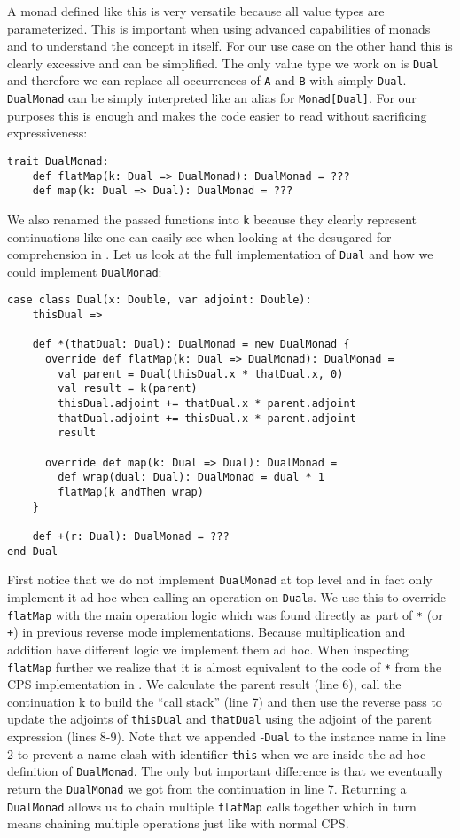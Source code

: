 A monad defined like this is very versatile because all value types are parameterized. This is important when using advanced capabilities of monads and to understand the concept in itself. For our use case on the other hand this is clearly excessive and can be simplified. The only value type we work on is \lstinline{Dual} and therefore we can replace all occurrences of \lstinline{A} and \lstinline{B} with simply \lstinline{Dual}. \lstinline{DualMonad} can be simply interpreted like an alias for \lstinline{Monad[Dual]}. For our purposes this is enough and makes the code easier to read without sacrificing expressiveness:
\begin{lstlisting}
trait DualMonad:
    def flatMap(k: Dual => DualMonad): DualMonad = ???
    def map(k: Dual => Dual): DualMonad = ???
\end{lstlisting}
We also renamed the passed functions into \lstinline{k} because they clearly represent continuations like one can easily see when looking at the desugared for-comprehension in . Let us look at the full implementation of \lstinline{Dual} and how we could implement \lstinline{DualMonad}:
\begin{lstlisting}
case class Dual(x: Double, var adjoint: Double):
    thisDual =>
  
    def *(thatDual: Dual): DualMonad = new DualMonad {
      override def flatMap(k: Dual => DualMonad): DualMonad =
        val parent = Dual(thisDual.x * thatDual.x, 0)
        val result = k(parent)
        thisDual.adjoint += thatDual.x * parent.adjoint
        thatDual.adjoint += thisDual.x * parent.adjoint
        result
  
      override def map(k: Dual => Dual): DualMonad =
        def wrap(dual: Dual): DualMonad = dual * 1
        flatMap(k andThen wrap)
    }

    def +(r: Dual): DualMonad = ???
end Dual
\end{lstlisting}
First notice that we do not implement \lstinline{DualMonad} at top level and in fact only implement it ad hoc when calling an operation on \lstinline{Dual}s. We use this to override \lstinline{flatMap} with the main operation logic which was found directly as part of \lstinline{*} (or \lstinline{+}) in previous reverse mode implementations. Because multiplication and addition have different logic we implement them ad hoc. When inspecting \lstinline{flatMap} further we realize that it is almost equivalent to the code of \lstinline{*} from the CPS implementation in . We calculate the parent result (line 6), call the continuation k to build the ``call stack'' (line 7) and then use the reverse pass to update the adjoints of \lstinline{thisDual} and \lstinline{thatDual} using the adjoint of the parent expression (lines 8-9). Note that we appended -\lstinline{Dual} to the instance name in line 2 to prevent a name clash with identifier \lstinline{this} when we are inside the ad hoc definition of \lstinline{DualMonad}. The only but important difference is that we eventually return the \lstinline{DualMonad} we got from the continuation in line 7. Returning a \lstinline{DualMonad} allows us to chain multiple \lstinline{flatMap} calls together which in turn means chaining multiple operations just like with normal CPS.


